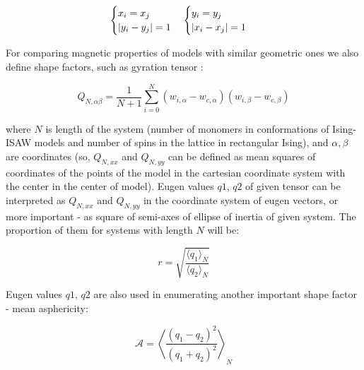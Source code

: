 \documentclass[aps,pre,amssymb,amsmath,twocolumn,floatfix]{revtex4-2}
\begin{document}
\begin{equation*}
\centering
    \begin{cases}
    x_{i} = x_{j} \\
    |y_{i} - y_{j}| = 1\\
    \end{cases} 
    \begin{cases}
    y_{i} = y_{j} \\
    |x_{i} - x_{j}| = 1\\
    \end{cases} 
\end{equation*}

For comparing magnetic properties of models with similar geometric ones we also define shape factors, such as gyration tensor \cite{Caracciolo_2011}:

\begin{equation}\label{eq:Ten_G1}
    Q_{N,\alpha\beta} = \frac{1}{N+1} \sum^{N}_{i=0}(w_{i,\alpha} - w_{c, \alpha})(w_{i,\beta} - w_{c, \beta})
\end{equation}

where $N$ is length of the system (number of monomers in conformations of Ising-ISAW models and number of spins in the lattice in rectangular Ising), and  $\alpha,\beta$ are coordinates (so, $Q_{N, xx}$ and $Q_{N,yy}$ can be defined as mean squares of coordinates of the points of the model in the cartesian coordinate system with the center in the center of model). Eugen values $q1$, $q2$ of given tensor can be interpreted as $Q_{N, xx}$ and $Q_{N,yy}$ in the coordinate system of eugen vectors, or more important - as square of semi-axes of ellipse of inertia of given system. The proportion of them for systems with length $N$ will be\cite{Caracciolo_2011}: 

\begin{equation}
    r = \sqrt{\frac{\langle q_{1}\rangle_{N}}{\langle q_{2} \rangle_{N}}}
\end{equation}

Eugen values $q1$, $q2$ are also used in enumerating another important shape factor - mean asphericity\cite{Caracciolo_2011}:

\begin{equation}
\label{eq:Asphericity}
    \mathcal{A} = \left\langle \frac{(q_{1} - q_{2})^{2}}{(q_{1} + q_{2})^{2}} \right\rangle_{N}
\end{equation}

\end{document}
